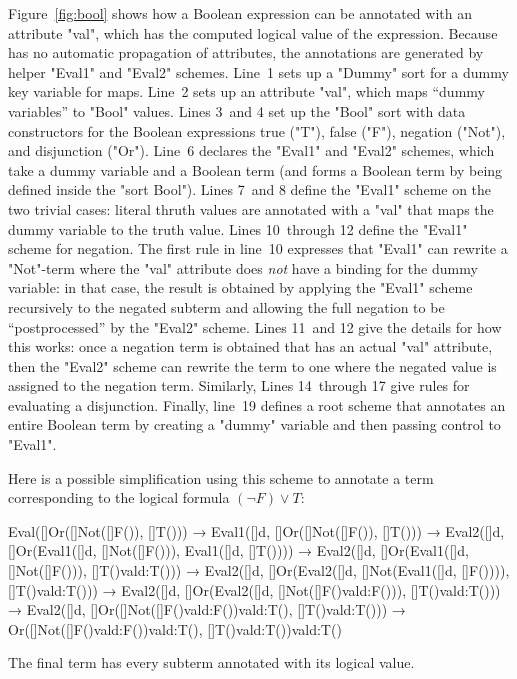 \documentclass[letterpaper,11pt]{article}
\begin{document}
\begin{example}\label{ex:bool}
  Figure~\ref{fig:bool} shows how a Boolean expression can be annotated with an attribute "val",
  which has the computed logical value of the expression. Because \hax has no automatic propagation
  of attributes, the annotations are generated by helper "Eval1" and "Eval2" schemes.
  Line~1 sets up a "Dummy" sort for a dummy key variable for maps. %
  Line~2 sets up an attribute "val", which maps ``dummy variables'' to "Bool" values. %
  Lines 3~and 4 set up the "Bool" sort with data constructors for the Boolean expressions true
  ("T"), false ("F"), negation ("Not"), and disjunction ("Or"). %
  Line~6 declares the "Eval1" and "Eval2" schemes, which take a dummy variable and a Boolean term
  (and forms a Boolean term by being defined inside the "sort Bool").  %
  Lines 7~and 8 define the "Eval1" scheme on the two trivial cases: literal thruth values are
  annotated with a "val" that maps the dummy variable to the truth value. %
  Lines 10~through 12 define the "Eval1" scheme for negation. %
  The first rule in line~10 expresses that "Eval1" can rewrite a "Not"-term where the "val"
  attribute does \emph{not} have a binding for the dummy variable: in that case, the result is
  obtained by applying the "Eval1" scheme recursively to the negated subterm and allowing the full
  negation to be ``postprocessed'' by the "Eval2" scheme. %
  Lines 11~and 12 give the details for how this works: once a negation term is obtained that has an
  actual "val" attribute, then the "Eval2" scheme can rewrite the term to one where the negated
  value is assigned to the negation term. %
  Similarly, Lines 14~through 17 give rules for evaluating a disjunction. %
  Finally, line~19 defines a root scheme that annotates an entire Boolean term by creating a "dummy"
  variable and then passing control to "Eval1".

  Here is a possible simplification using this scheme to annotate a term corresponding to the
  logical formula $(¬F)∨T$:
  \begin{hacs}
    Eval([]Or([]Not([]F()), []T()))
    → Eval1([]d, []Or([]Not([]F()), []T()))
    → Eval2([]d, []Or(Eval1([]d, []Not([]F())), Eval1([]d, []T())))
    → Eval2([]d, []Or(Eval1([]d, []Not([]F())), []T()val{d:T()}))
    → Eval2([]d, []Or(Eval2([]d, []Not(Eval1([]d, []F()))), []T()val{d:T()}))
    → Eval2([]d, []Or(Eval2([]d, []Not([]F()val{d:F()})), []T()val{d:T()}))
    → Eval2([]d, []Or([]Not([]F()val{d:F()})val{d:T()}, []T()val{d:T()}))
    → Or([]Not([]F()val{d:F()})val{d:T()}, []T()val{d:T()})val{d:T()}
  \end{hacs}%
  The final term has every subterm annotated with its logical value.
\end{example}
\end{document}
